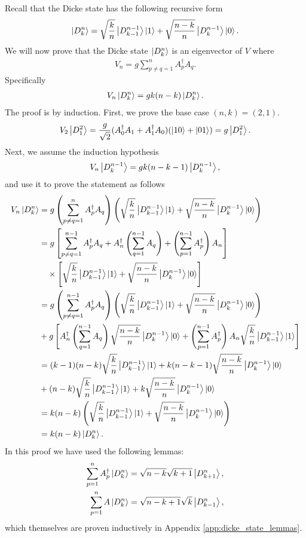 \documentclass[Dual]{msu-thesis}
\begin{document}
Recall that the Dicke state \cite{ref:dicke} has the following recursive form
\begin{align}
\label{dicke_def}
\ket{D^n_k}
=
\sqrt{\frac{k}{n}}\ket{D^{n-1}_{k-1}}\ket{1}+\sqrt{\frac{n-k}{n}}\ket{D^{n-1}_k}\ket{0}
.\end{align}
We will now prove that the Dicke state $\ket{D^n_k}$ is an eigenvector of $V$ where
\begin{align}
V_n=g\sum_{p\neq q=1}^nA^\dagger_pA_q
.\end{align}
Specifically
\begin{align}
V_n\ket{D^n_k} 
=
gk(n-k)\ket{D^n_k}
.\end{align}
The proof is by induction. First, we prove the base case $(n,k)=(2,1)$.
\begin{align}
V_2\ket{D^2_1}
=
\frac{g}{\sqrt{2}}(A^\dagger_0A_1+A^\dagger_1A_0)(\ket{10}+\ket{01})
=
g\ket{D^2_1}
.\end{align}
Next, we assume the induction hypothesis
\begin{align}
V_n\ket{D^{n-1}_k} 
=
gk(n-k-1)\ket{D^{n-1}_k}
,\end{align}
and use it to prove the statement as follows
\begin{align}
V_n\ket{D^n_k}
&=
g
\left(\sum_{p\neq q=1}^nA^\dagger_pA_q\right)
\left(\sqrt{\frac{k}{n}}\ket{D^{n-1}_{k-1}}\ket{1}+\sqrt{\frac{n-k}{n}}\ket{D^{n-1}_k}\ket{0}\right)
\\
&=
g
\left[
\sum_{p\neq q=1}^{n-1}A^\dagger_pA_q
+
A^\dagger_n\left(\sum_{q=1}^{n-1}A_q\right)
+
\left(\sum_{p=1}^{n-1}A^\dagger_p\right)A_n
\right]
\nonumber
\\
& \hspace{3.5mm} \times
\left[\sqrt{\frac{k}{n}}\ket{D^{n-1}_{k-1}}\ket{1}+\sqrt{\frac{n-k}{n}}\ket{D^{n-1}_k}\ket{0}\right]
\\
&=
g
\left(\sum_{p\neq q=1}^{n-1}A^\dagger_pA_q\right)
\left(\sqrt{\frac{k}{n}}\ket{D^{n-1}_{k-1}}\ket{1}+\sqrt{\frac{n-k}{n}}\ket{D^{n-1}_k}\ket{0}\right)
\nonumber
\\
&+
g
\left[
A^\dagger_n\left(\sum_{q=1}^{n-1}A_q\right)
\sqrt{\frac{n-k}{n}}\ket{D^{n-1}_k}\ket{0}
+
\left(\sum_{p=1}^{n-1}A^\dagger_p\right)A_n
\sqrt{\frac{k}{n}}\ket{D^{n-1}_{k-1}}\ket{1}
\right]
\\
&=
(k-1)(n-k)\sqrt{\frac{k}{n}}\ket{D^{n-1}_{k-1}}\ket{1}
+
k(n-k-1)\sqrt{\frac{n-k}{n}}\ket{D^{n-1}_k}\ket{0}
\nonumber
\\
&+
(n-k)\sqrt{\frac{k}{n}}\ket{D^{n-1}_{k-1}}\ket{1}
+
k\sqrt{\frac{n-k}{n}}\ket{D^{n-1}_k}\ket{0}
\\
&=
k(n-k)\left(\sqrt{\frac{k}{n}}\ket{D^{n-1}_{k-1}}\ket{1}+\sqrt{\frac{n-k}{n}}\ket{D^{n-1}_k}\ket{0}\right)
\\
&=
k(n-k)\ket{D^n_k}
.\end{align}
In this proof we have used the following lemmas:
\begin{align}
\sum_{p=1}^nA^\dagger_p\ket{D^n_k}
&=\sqrt{n-k}\sqrt{k+1}\ket{D^n_{k+1}},
\\
\sum_{p=1}^nA\ket{D^n_k}
&=\sqrt{n-k+1}\sqrt{k}\ket{D^n_{k-1}},
\end{align}
which themselves are proven inductively in Appendix \ref{app:dicke_state_lemmas}. 
\end{document}
